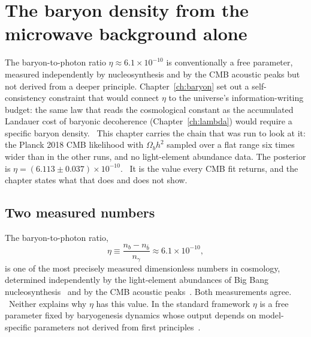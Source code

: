 \chapter{The baryon density from the microwave background alone}\label{ch:baryon_chain}

The baryon-to-photon ratio $\eta\approx6.1\times10^{-10}$ is conventionally a free parameter, measured independently by nucleosynthesis
and by the CMB acoustic peaks but not derived from a deeper principle. Chapter~\ref{ch:baryon} set out a self-consistency constraint that
would connect $\eta$ to the universe's information-writing budget: the same law that reads the cosmological constant as the accumulated
Landauer cost of baryonic decoherence (Chapter~\ref{ch:lambda}) would require a specific baryon density. \conjecture\ This chapter
carries the chain that was run to look at it: the Planck 2018 CMB likelihood with $\Omega_bh^2$ sampled over a flat range six times wider
than in the other runs, and no light-element abundance data. The posterior is $\eta=(6.113\pm0.037)\times10^{-10}$. \measured\ It is the
value every CMB fit returns, and the chapter states what that does and does not show.

\section{Two measured numbers}\label{sec:bc_intro}
The baryon-to-photon ratio,
\begin{equation}\eta\equiv\frac{n_b-n_{\bar b}}{n_\gamma}\approx6.1\times10^{-10},\label{eq:bc_eta}\end{equation}
is one of the most precisely measured dimensionless numbers in cosmology, determined independently by the light-element abundances of
Big Bang nucleosynthesis~\cite{Cyburt2016} and by the CMB acoustic peaks~\cite{Planck2018VI}. Both measurements agree. \observed\ Neither explains
why $\eta$ has this value. In the standard framework $\eta$ is a free parameter fixed by baryogenesis dynamics whose output depends on
model-specific parameters not derived from first principles~\cite{RubakovShaposhnikov1996,Davidson2008}.

